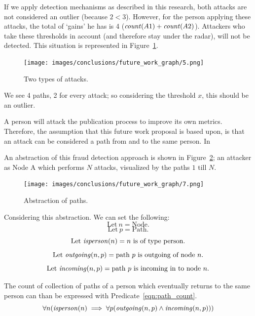\documentclass{ou-report}
\begin{document}
If we apply detection mechanisms as described in this research, both attacks 
are not considered an outlier (because $2 < 3$).
However, for the person applying these attacks, the total of `gains' he has
is 4 ($\mathit{count}(A1) + \mathit{count}(A2)$). Attackers who take these thresholds in 
account (and therefore stay under the radar), will not be detected. This 
situation is represented in Figure~\ref{fig:graph_5}.

\begin{figure}[H]
    \centering
    \texttt{[image: images/conclusions/future\_work\_graph/5.png]}
    \caption{Two types of attacks.}
    \label{fig:graph_5}
\end{figure}

We see 4 paths, 2 for every attack; so considering the threshold $x$, this 
should be an outlier. 

A person will attack the publication process to improve its own metrics.
Therefore, the assumption that this future work proposal is based upon, is
that an attack can be considered a path from and to the 
same person. In 

An abstraction of this fraud detection approach is shown in 
Figure~\ref{fig:graph_7}; an attacker as Node A which performs $N$
attacks, visualized by the paths $1$ till $N$.

\begin{figure}[H]
    \centering
    \texttt{[image: images/conclusions/future\_work\_graph/7.png]}
    \caption{Abstraction of paths.}
    \label{fig:graph_7}
\end{figure}

\newcommand{\incoming}{\mi{incoming}}
\newcommand{\outgoing}{\mi{outgoing}}
\newcommand{\isperson}{\mi{isperson}}
\newcommand{\isaffiliation}{\mi{isaffiliation}}
\newcommand{\isjournal}{\mi{isjournal}}

Considering this abstraction. We can set the following:
\[ \text{Let}\ n=\text{Node}. \] 
\[ \text{Let}\ p=\text{Path}. \]
\[ \text{Let}\ \isperson(n)=n\text{ is of type person.} \]
\[ \text{Let}\ \outgoing(n, p)=\text{path }p\text{ is outgoing of node }n\text{.} \]
\[ \text{Let}\ \incoming(n, p)=\text{path }p\text{ is incoming in to node }n\text{.} \]

The count of collection of paths of a person which eventually returns to 
the same person can than be expressed with Predicate~\ref{eqn:path_count}.
\begin{equation}
\label{eqn:path_count}
\forall n (\isperson(n) \implies \forall p(\outgoing(n, p) \land \incoming(n, p)))
\end{equation}
\end{document}
